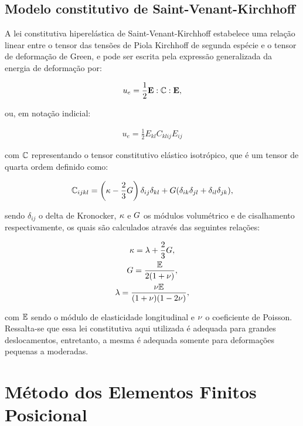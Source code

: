 \documentclass[tese_patricia]{subfiles}
\begin{document}
\subsection{Modelo constitutivo de Saint-Venant-Kirchhoff}

A lei constitutiva hiperelástica de Saint-Venant-Kirchhoff estabelece uma relação linear entre o tensor das tensões de Piola Kirchhoff de segunda espécie e o tensor de deformação de Green, e pode ser escrita pela expressão generalizada da energia de deformação por:

\begin{align}
u_{e} = \frac{1}{2} \mathbf{E} : \mathbb{C} : \mathbf{E},
\end{align}

\noindent ou, em notação indicial:

\begin{align}
u_{e} = \frac{1}{2} E_{kl} C_{klij} E_{ij}
\end{align}


\noindent com $\mathbb{C}$ representando o tensor constitutivo elástico isotrópico, que é um tensor de quarta ordem definido como:

\begin{gather}
\mathbb{C}_{ijkl}=\left(\kappa - \frac{2}{3}G \right)\delta_{ij}\delta_{kl} + G(\delta_{ik}\delta_{jl}+\delta_{il}\delta_{jk}),
\end{gather}

\noindent sendo $\delta_{ij}$ o delta de Kronocker, $\kappa$ e $G$ os módulos volumétrico e de cisalhamento respectivamente, os quais são calculados através das seguintes relações:

\begin{gather}
\kappa=\lambda+\frac{2}{3}G,\\
G=\frac{\mathbb{E}}{2(1+\nu)},\\
\lambda=\frac{\nu \mathbb{E}}{(1+\nu)(1-2\nu)},
\end{gather}

\noindent com $\mathbb{E}$ sendo o módulo de elasticidade longitudinal e $\nu$ o coeficiente de Poisson. Ressalta-se que essa lei constitutiva aqui utilizada é adequada para grandes deslocamentos, entretanto, a mesma é adequada somente para deformações pequenas a moderadas.

\section{Método dos Elementos Finitos Posicional}
\end{document}
